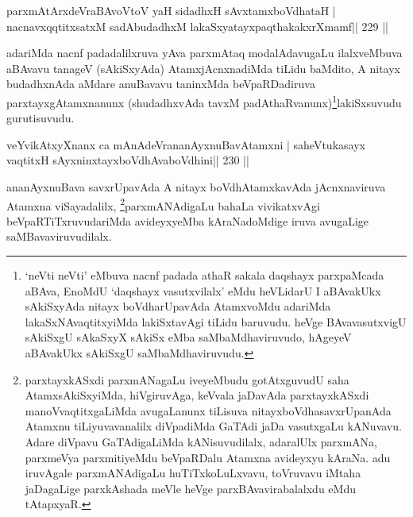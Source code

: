 
\begin{shl}
parxmAtArxdeVraBAvoV\s toV yaH sidadhxH sAvxtamxboVdhataH |
nacnavxqqtitxsatxM sadAbudadhxM lakaSxyatayxpaqthakakxrXmamf\hfill || 229 ||
\end{shl}

\begin{artha}
adariMda nacnf padadalilxruva yAva parxmAtaq modalAdavugaLu
ilalxveMbuva aBAvavu tanageV (sAkiSxyAda) AtamxjAcnxnadiMda tiLidu
baMdito, A nitayx budadhxnAda aMdare anuBavavu taninxMda
beVpaRDadiruva parxtayxgAtamxnanunx (shudadhxvAda
tavxM padAthaRvanunx)\footnote{`neVti neVti' eMbuva nacnf padada
  athaR sakala daqshayx parxpaMcada aBAva, EnoMdU `daqshayx
  vasutxvilalx' eMdu heVLidarU I aBAvakUkx sAkiSxyAda nitayx
  boVdharUpavAda AtamxvoMdu adariMda lakaSxNAvaqtitxyiMda lakiSxtavAgi
tiLidu baruvudu. heVge BAvavasutxvigU sAkiSxgU sAkaSxyX sAkiSx eMba
saMbaMdhaviruvudo, hAgeyeV aBAvakUkx sAkiSxgU saMbaMdhaviruvudu.}lakiSxsuvudu
gurutisuvudu.
\end{artha}


\begin{shl}
veYvikAtxyXnanx ca mAnAdeVrananAyxnuBavAtamxni |
saheVtukasayx vaqtitxH sAyxninxtayxboVdhAvaboVdhini\hfill || 230 ||
\end{shl}

\begin{artha}
ananAyxnuBava savxrUpavAda A nitayx boVdhAtamxkavAda jAcnxnaviruva
Atamxna viSayadalilx, \footnote{parxtayxkASxdi parxmANagaLu
  iveyeMbudu gotAtxguvudU saha AtamxsAkiSxyiMda, hiVgiruvAga, keVvala
jaDavAda parxtayxkASxdi manoVvaqtitxgaLiMda avugaLanunx tiLisuva
nitayxboVdhasavxrUpanAda Atamxnu tiLiyuvavanalilx diVpadiMda GaTAdi
jaDa vasutxgaLu kANuvavu. Adare diVpavu GaTAdigaLiMda kANisuvudilalx,
adaralUlx parxmANa, parxmeVya parxmitiyeMdu beVpaRDalu Atamxna
avideyxyu kAraNa. adu iruvAgale parxmANAdigaLu huTiTxkoLuLxvavu,
toVruvavu iMtaha jaDagaLige parxkAshada meVle heVge 
parxBAvavirabalalxdu eMdu tAtapxyaR.}parxmANAdigaLu bahaLa vivikatxvAgi
beVpaRTiTxruvudariMda avideyxyeMba kAraNadoMdige iruva avugaLige
saMBavaviruvudilalx.
\end{artha}


